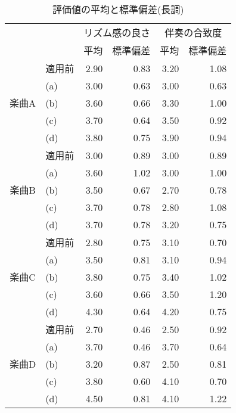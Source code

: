 \begin{table}[h]
  \caption{評価値の平均と標準偏差(長調)}
  \label{tab:question_cyou}
  \centering
  \begin{tabular}{|c|l|r|r|r|r|} \hline
      \multicolumn{2}{|c|}{} & \multicolumn{2}{|c|}{リズム感の良さ} &  \multicolumn{2}{|c|}{伴奏の合致度}   \\ \cline{3-6}
      \multicolumn{2}{|c|}{} & 平均 & 標準偏差 & 平均 & 標準偏差 \\ \hline

      \multirow{5}{*}{楽曲A}  & 適用前 & 2.90  & 0.83  & 3.20  & 1.08 \\ \cline{2-6}
      & (a) & 3.00  & 0.63  & 3.00  & 0.63 \\ \cline{2-6}
      & (b) & 3.60  & 0.66  & 3.30  & 1.00 \\ \cline{2-6}
      & (c) & 3.70  & 0.64  & 3.50  & 0.92 \\ \cline{2-6}
      & (d) & 3.80  & 0.75  & 3.90  & 0.94 \\ \cline{1-6}

      \multirow{5}{*}{楽曲B}  & 適用前 & 3.00  & 0.89  & 3.00  & 0.89 \\ \cline{2-6}
      & (a) & 3.60  & 1.02  & 3.00  & 1.00 \\ \cline{2-6}
      & (b) & 3.50  & 0.67  & 2.70  & 0.78 \\ \cline{2-6}
      & (c) & 3.70  & 0.78  & 2.80  & 1.08 \\ \cline{2-6}
      & (d) & 3.70  & 0.78  & 3.20  & 0.75 \\ \cline{1-6}

      \multirow{5}{*}{楽曲C}  & 適用前 & 2.80  & 0.75  & 3.10  & 0.70 \\ \cline{2-6}
      & (a) & 3.50  & 0.81  & 3.10  & 0.94 \\ \cline{2-6}
      & (b) & 3.80  & 0.75  & 3.40  & 1.02 \\ \cline{2-6}
      & (c) & 3.60  & 0.66  & 3.50  & 1.20 \\ \cline{2-6}
      & (d) & 4.30  & 0.64  & 4.20  & 0.75 \\ \cline{1-6}

      \multirow{5}{*}{楽曲D}  & 適用前 & 2.70  & 0.46  & 2.50  & 0.92 \\ \cline{2-6}
      & (a) & 3.70  & 0.46  & 3.70  & 0.64 \\ \cline{2-6}
      & (b) & 3.20  & 0.87  & 2.50  & 0.81 \\ \cline{2-6}
      & (c) & 3.80  & 0.60  & 4.10  & 0.70 \\ \cline{2-6}
      & (d) & 4.50  & 0.81  & 4.10  & 1.22 \\ \cline{1-6}


\end{tabular}
\end{table}
